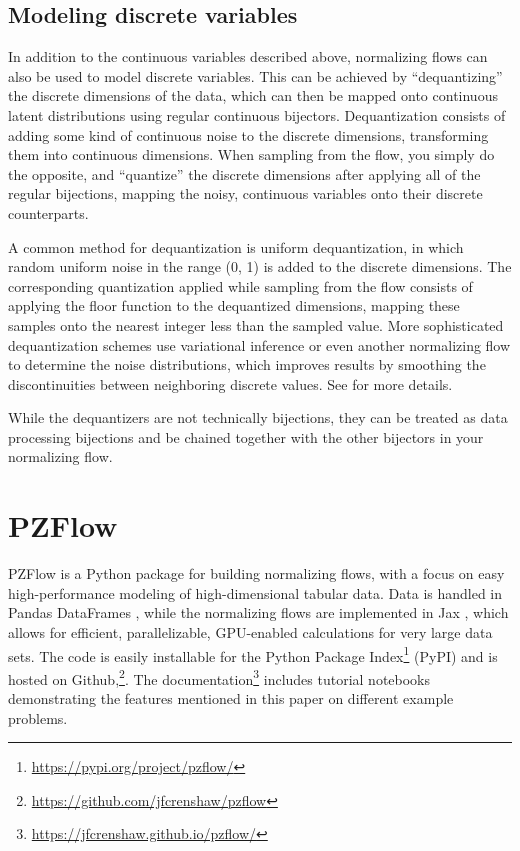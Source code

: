 \documentclass[twocolumn]{aastex631}
\begin{document}
\subsection{Modeling discrete variables}
\label{sec:discrete}

In addition to the continuous variables described above, normalizing flows can also be used to model discrete variables.
This can be achieved by ``dequantizing'' the discrete dimensions of the data, which can then be mapped onto continuous latent distributions using regular continuous bijectors.
Dequantization consists of adding some kind of continuous noise to the discrete dimensions, transforming them into continuous dimensions.
When sampling from the flow, you simply do the opposite, and ``quantize'' the discrete dimensions after applying all of the regular bijections, mapping the noisy, continuous variables onto their discrete counterparts.

A common method for dequantization is uniform dequantization, in which random uniform noise in the range (0, 1) is added to the discrete dimensions.
The corresponding quantization applied while sampling from the flow consists of applying the floor function to the dequantized dimensions, mapping these samples onto the nearest integer less than the sampled value.
More sophisticated dequantization schemes use variational inference or even another normalizing flow to determine the noise distributions, which improves results by smoothing the discontinuities between neighboring discrete values.
See \citet{ho2019} \citet{hoogeboom2020} for more details.

While the dequantizers are not technically bijections, they can be treated as data processing bijections and be chained together with the other bijectors in your normalizing flow.


\section{PZFlow}
\label{sec:pzflow}

PZFlow is a Python package for building normalizing flows, with a focus on easy high-performance modeling of high-dimensional tabular data.
Data is handled in Pandas DataFrames \citep{pandas}, while the normalizing flows are implemented in Jax \citep{jax}, which allows for efficient, parallelizable, GPU-enabled calculations for very large data sets.
The code is easily installable for the Python Package Index\footnote{\url{https://pypi.org/project/pzflow/}} (PyPI) and is hosted on Github,\footnote{\url{https://github.com/jfcrenshaw/pzflow}}.
The documentation\footnote{\url{https://jfcrenshaw.github.io/pzflow/}} includes tutorial notebooks demonstrating the features mentioned in this paper on different example problems.
\end{document}
